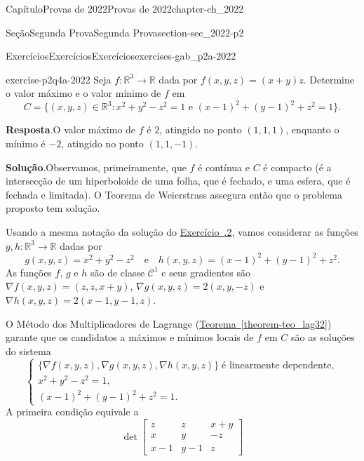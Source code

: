 \documentclass[oneside,10pt,]{book}
\newcommand{\blocktitlefont}{\relax}
\newcommand{\xreffont}{\relax}
\numberwithin{equation}{section}
\newcommand{\R}{\mathbb R}
\begin{document}
\begin{chapterptx}{Capítulo}{Provas de 2022}{}{Provas de 2022}{}{}{chapter-ch_2022}
\begin{sectionptx}{Seção}{Segunda Prova}{}{Segunda Prova}{}{}{section-sec_2022-p2}
\begin{exercises-subsection-numberless}{Exercícios}{Exercícios}{}{Exercícios}{}{}{exercises-gab_p2a-2022}
\begin{divisionexercise}{4}{}{}{exercise-p2q4a-2022}%
Seja \(f\colon\R^3\to\R\) dada por \(f(x,y,z)=(x+y)z\). Determine o valor máximo e o valor mínimo de \(f\) em%
\begin{equation*}
C= \big\{ (x,y,z) \in \R^3\colon x^2 + y^2 -
z^2 = 1\text{ e } (x-1)^2 + (y-1)^2 +z^2 =1\big\}.
\end{equation*}
\par\smallskip%
\noindent\textbf{\blocktitlefont Resposta}.\hypertarget{answer-p2q4a-2022-b}{}\quad{}O valor máximo de \(f\) é \(2\), atingido no ponto \((1,1,1)\), enquanto o mínimo é \(-2\), atingido no ponto \((1,1,-1)\).\par\smallskip%
\noindent\textbf{\blocktitlefont Solução}.\hypertarget{solution-p2q4a-2022-c}{}\quad{}Observamos, primeiramente, que \(f\) é contínua e \(C\) é compacto (é a intersecção de um hiperboloide de uma folha, que é fechado, e uma esfera, que é fechada e limitada). O Teorema de Weierstrass assegura então que o problema proposto tem solução.%
\par
Usando a mesma notação da solução do \hyperlink{exercise-p2q2a-2022}{Exercício~{\xreffont 3.2.2}}, vamos considerar as funções \(g,h\colon\R^3\to\R\) dadas por%
\begin{equation*}
g(x,y,z) = x^2 + y^2 - z^2 \quad\text{e}\quad h(x,y,z) =
(x-1)^2 + (y-1)^2 + z^2.
\end{equation*}
As funções \(f\), \(g\) e \(h\) são de classe \(\mathscr{C}^1\) e seus gradientes são \(\nabla f(x,y,z) = (z,z, x+y)\), \(\nabla g(x,y,z) =
2(x,y,-z)\) e \(\nabla h(x,y,z) = 2 (x-1, y-1, z)\).%
\par
O Método dos Multiplicadores de Lagrange (\hyperref[theorem-teo_lag32]{Teorema~{\xreffont\ref{theorem-teo_lag32}}}) garante que os candidatos a máximos e mínimos locais de \(f\) em \(C\) são as soluções do sistema%
\begin{equation*}
\begin{cases} \{ \nabla f(x,y,z), \nabla g(x,y,z),
\nabla h(x,y,z)\}\; \text{é linearmente dependente},\\ x^2 +
y^2 - z^2 = 1,\\ (x-1)^2 +(y-1)^2+ z^2 = 1.  \end{cases}
\end{equation*}
A primeira condição equivale a%
\begin{equation*}
\det\begin{bmatrix} z & z
& x+y\\ x & y & -z\\ x-1 & y-1 & z

\end{bmatrix}
\end{equation*}
\end{divisionexercise}
\end{exercises-subsection-numberless}
\end{sectionptx}
\end{chapterptx}
\end{document}
